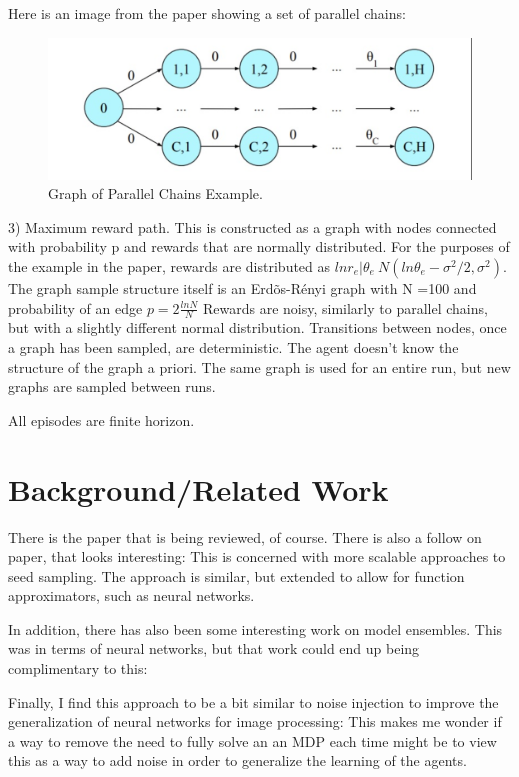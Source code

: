 \documentclass{article}
\begin{document}
Here is an image from the paper showing a set of parallel chains:

\begin{figure}[htbp!]
  \centering
\includegraphics[scale=.25]{parallelchains.png}

  \caption{Graph of Parallel Chains Example.}
 \label{fig:parallelchains}
\end{figure}
3) Maximum reward path. This is constructed as a graph with nodes connected with probability p and rewards that are normally distributed. For the purposes of the example in the paper, rewards are distributed as $ln r_e | \theta_e ~ N(ln \theta_e - \sigma^2/2,\sigma^2)$. The graph sample structure itself is an Erd\~os-R\'enyi graph with N =100 and probability of an edge $p=2 \frac{ln N}{N}$ Rewards are noisy, similarly to parallel chains, but with a slightly different normal distribution. Transitions between nodes, once a graph has been sampled, are deterministic. The agent doesn't know the structure of the graph a priori. The same graph is used for an entire run, but new graphs are sampled between runs.

All episodes are finite horizon.

\section{Background/Related Work}
There is the paper that is being reviewed, of course. There is also a follow on paper, that looks interesting: \cite{SCALSS} This is concerned with more scalable approaches to seed sampling. The approach is similar, but extended to allow for function approximators, such as neural networks.

In addition, there has also been some interesting work on model ensembles. This was in terms of neural networks, but that work could end up being complimentary to this: \cite{1503.02531}

Finally, I find this approach to be a bit similar to noise injection to improve the generalization of neural networks for image processing: \cite{zur2009noise} This makes me wonder if a way to remove  the need to fully solve an an MDP each time might be to view this as a way to add noise in order to generalize the learning of the agents.
\end{document}
